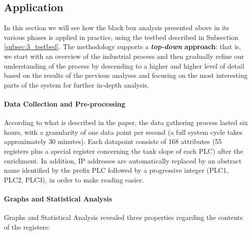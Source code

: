 \subsection{Application}
\label{subsec:ceccato_application}
In this section we will see how the black box analysis presented above in its various phases is applied in practice, using the testbed described in Subsection \ref{subsec:3_testbed}.
The methodology supports a \textbf{\textit{top-down} approach}: that is, we start with an overview of the industrial process and then gradually refine our understanding of the process by descending to a higher and higher level of detail based on the results of the previous analyses and focusing on the most interesting parts of the system for further in-depth analysis.

\paragraph{Data Collection and Pre-processing}
\label{par:3_preproc_appl} 
According to what is described in the paper, the data gathering process lasted six hours, with a granularity of one data point per second (a full system cycle takes approximately 30 minutes). Each datapoint consists of 168 attributes (55 registers plus a special register concerning the tank slope of each PLC) after the enrichment. In addition, IP addresses are automatically replaced by an abstract name identified by the prefix PLC followed by a progressive integer (PLC1, PLC2, PLC3), in order to make reading easier.

\paragraph{Graphs and Statistical Analysis}
\label{par:3_graphs_appl}
Graphs and Statistical Analysis revealed three properties regarding the contents of the registers: 

